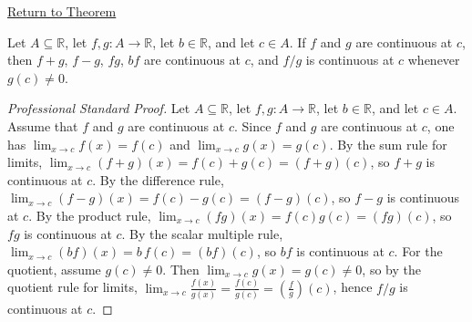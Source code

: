 \newpage
{}
\label{prf:continuity-algebra-at-a-point}

\begin{remark*}[Return]
\hyperref[thm:continuity-algebra-at-a-point]{Return to Theorem}
\end{remark*}

\begin{theorem*}
Let $A \subseteq \mathbb{R}$, let $f,g : A \to \mathbb{R}$, let $b \in \mathbb{R}$, and let $c \in A$. If $f$ and $g$ are continuous at $c$, then $f+g$, $f-g$, $fg$, $bf$ are continuous at $c$, and $f/g$ is continuous at $c$ whenever $g(c) \neq 0$.
\end{theorem*}

\begin{proof}[Professional Standard Proof]
\LRAProofBodyStart
Let $A \subseteq \mathbb{R}$, let $f,g : A \to \mathbb{R}$, let $b \in \mathbb{R}$, and let $c \in A$. Assume that $f$ and $g$ are continuous at $c$. Since $f$ and $g$ are continuous at $c$, one has $\lim_{x\to c} f(x)=f(c)$ and $\lim_{x\to c} g(x)=g(c)$. By the sum rule for limits, $\lim_{x\to c} (f+g)(x)=f(c)+g(c)=(f+g)(c)$, so $f+g$ is continuous at $c$. By the difference rule, $\lim_{x\to c} (f-g)(x)=f(c)-g(c)=(f-g)(c)$, so $f-g$ is continuous at $c$. By the product rule, $\lim_{x\to c} (fg)(x)=f(c)g(c)=(fg)(c)$, so $fg$ is continuous at $c$. By the scalar multiple rule, $\lim_{x\to c} (bf)(x)=b\,f(c)=(bf)(c)$, so $bf$ is continuous at $c$. For the quotient, assume $g(c) \neq 0$. Then $\lim_{x\to c} g(x)=g(c) \neq 0$, so by the quotient rule for limits, $\lim_{x\to c} \frac{f(x)}{g(x)} = \frac{f(c)}{g(c)} = \left(\frac{f}{g}\right)(c)$, hence $f/g$ is continuous at $c$.
\end{proof}

